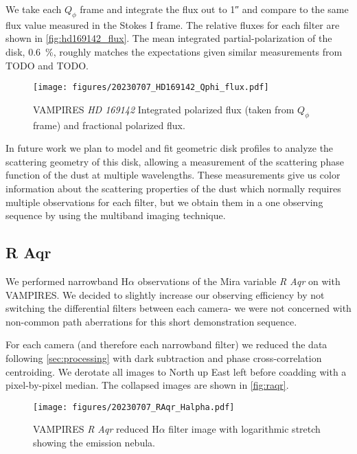We take each $Q_\phi$ frame and integrate the flux out to \ang{;;1} and compare to the same flux value measured in the Stokes I frame. The relative fluxes for each filter are shown in \autoref{fig:hd169142_flux}. The mean integrated partial-polarization of the disk, \SI{0.6}{\%}, roughly matches the expectations given similar measurements from TODO and TODO. 

\begin{figure}
    \centering
    \texttt{[image: figures/20230707\_HD169142\_Qphi\_flux.pdf]}
    \caption{ VAMPIRES \textit{HD 169142} Integrated polarized flux (taken from $Q_\phi$ frame) and fractional polarized flux.\label{fig:hd169142_flux}}
\end{figure}

In future work we plan to model and fit geometric disk profiles to analyze the scattering geometry of this disk, allowing a measurement of the scattering phase function of the dust at multiple wavelengths. These measurements give us color information about the scattering properties of the dust which normally requires multiple observations for each filter, but we obtain them in a one observing sequence by using the multiband imaging technique.

\subsection{R Aqr\label{sec:raqr}}

We performed narrowband H$\alpha$ observations of the Mira variable \textit{R Aqr} on  with VAMPIRES. We decided to slightly increase our observing efficiency by not switching the differential filters between each camera- we were not concerned with non-common path aberrations for this short demonstration sequence.

For each camera (and therefore each narrowband filter) we reduced the data following \autoref{sec:processing} with dark subtraction and phase cross-correlation centroiding. We derotate all images to North up East left before coadding with a pixel-by-pixel median. The collapsed images are shown in \autoref{fig:raqr}.

\begin{figure}
    \centering
    \texttt{[image: figures/20230707\_RAqr\_Halpha.pdf]}
    \caption{ VAMPIRES \textit{R Aqr} reduced H$\alpha$ filter image with logarithmic stretch showing the emission nebula.\label{fig:raqr}}
\end{figure}

